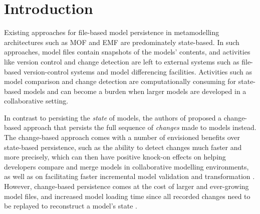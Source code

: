 \documentclass[12pt, a4paper]{report} \usepackage[titletoc]{appendix}
\begin{document}
\tableofcontents
{}

\listoffigures
\newpage
 
\listoftables
\newpage

\lstlistoflistings
\newpage

\chapter{Introduction}
\label{sec:introduction}
Existing approaches for file-based model persistence in metamodelling architectures such as MOF and EMF are predominately state-based. In such approaches, model files contain snapshots of the models' contents, and activities like version control and change detection are left to external systems such as file-based version-control systems and model differencing facilities. Activities such as model comparison and change detection are computationally consuming for state-based models and can become a burden when larger models are developed in a collaborative setting. 

In contrast to persisting the \emph{state} of models, the authors of  proposed a change-based approach that persists the full sequence of \emph{changes} made to models instead. The change-based approach comes with a number of envisioned benefits over state-based persistence, such as the ability to detect changes much faster and more precisely, which can then have positive knock-on effects on helping developers compare and merge models in collaborative modelling environments, as well as on facilitating faster incremental model validation and transformation \cite{rath2012derived,ogunyomi2015property}. However, change-based persistence comes at the cost of larger and ever-growing model files, and increased model loading time since all recorded changes need to be replayed to reconstruct a model's state \cite{yohannis2017turning}.
\end{document}
